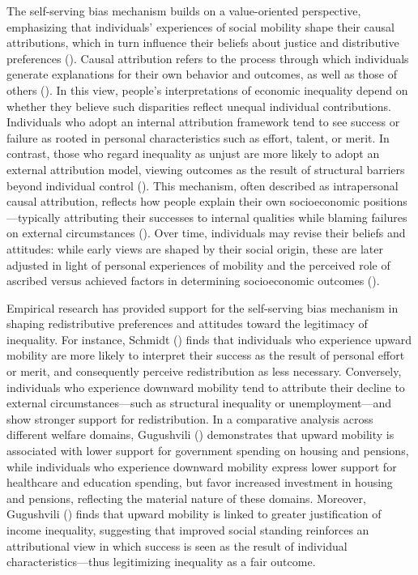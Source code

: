 \documentclass[
  12pt,
]{article}
\begin{document}
The self-serving bias mechanism builds on a value-oriented perspective,
emphasizing that individuals' experiences of social mobility shape their
causal attributions, which in turn influence their beliefs about justice
and distributive preferences
(). Causal
attribution refers to the process through which individuals generate
explanations for their own behavior and outcomes, as well as those of
others (). In this view, people's interpretations of economic inequality
depend on whether they believe such disparities reflect unequal
individual contributions. Individuals who adopt an internal attribution
framework tend to see success or failure as rooted in personal
characteristics such as effort, talent, or merit. In contrast, those who
regard inequality as unjust are more likely to adopt an external
attribution model, viewing outcomes as the result of structural barriers
beyond individual control (). This mechanism, often described as intrapersonal
causal attribution, reflects how people explain their own socioeconomic
positions---typically attributing their successes to internal qualities
while blaming failures on external circumstances
(). Over
time, individuals may revise their beliefs and attitudes: while early
views are shaped by their social origin, these are later adjusted in
light of personal experiences of mobility and the perceived role of
ascribed versus achieved factors in determining socioeconomic outcomes
().

Empirical research has provided support for the self-serving bias
mechanism in shaping redistributive preferences and attitudes toward the
legitimacy of inequality. For instance, Schmidt
() finds that individuals
who experience upward mobility are more likely to interpret their
success as the result of personal effort or merit, and consequently
perceive redistribution as less necessary. Conversely, individuals who
experience downward mobility tend to attribute their decline to external
circumstances---such as structural inequality or unemployment---and show
stronger support for redistribution. In a comparative analysis across
different welfare domains, Gugushvili
() demonstrates that
upward mobility is associated with lower support for government spending
on housing and pensions, while individuals who experience downward
mobility express lower support for healthcare and education spending,
but favor increased investment in housing and pensions, reflecting the
material nature of these domains. Moreover, Gugushvili
() finds that
upward mobility is linked to greater justification of income inequality,
suggesting that improved social standing reinforces an attributional
view in which success is seen as the result of individual
characteristics---thus legitimizing inequality as a fair outcome.
\end{document}
